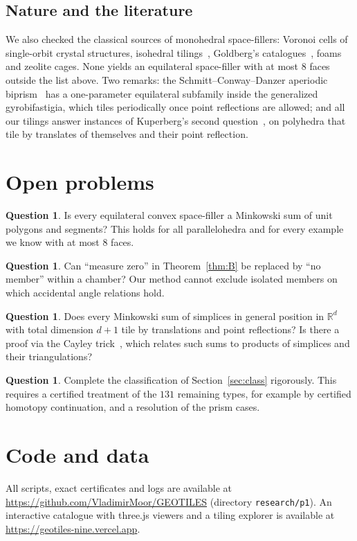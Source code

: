 \documentclass[11pt]{amsart}
\theoremstyle{definition}
\newtheorem{question}[thm]{Question}
\newcommand{\R}{\mathbb{R}}
\begin{document}
\subsection{Nature and the literature}
We also checked the classical sources of monohedral space-fillers: Voronoi cells of single-orbit crystal
structures, isohedral tilings~\cite{DFO05}, Goldberg's catalogues~\cite{Gol79}, foams and zeolite cages. None
yields an equilateral space-filler with at most $8$ faces outside the list above. Two remarks: the
Schmitt--Conway--Danzer aperiodic biprism~\cite{Sen95} has a one-parameter equilateral subfamily inside the
generalized gyrobifastigia, which tiles periodically once point reflections are allowed; and all our tilings answer
instances of Kuperberg's second question~\cite{Epp}, on polyhedra that tile by translates of themselves and their point
reflection.

\section{Open problems}\label{sec:open}

\begin{question}
Is every equilateral convex space-filler a Minkowski sum of unit polygons and segments? This holds for
all parallelohedra and for every example we know with at most $8$ faces.
\end{question}

\begin{question}
Can ``measure zero'' in Theorem~\ref{thm:B} be replaced by ``no member'' within a chamber? Our method cannot exclude
isolated members on which accidental angle relations hold.
\end{question}

\begin{question}
Does every Minkowski sum of simplices in general position in $\R^d$ with total dimension $d+1$ tile by
translations and point reflections? Is there a proof via the Cayley trick~\cite{HRS00}, which relates such sums to
products of simplices and their triangulations?
\end{question}

\begin{question}
Complete the classification of Section~\ref{sec:class} rigorously. This requires a certified treatment of the
$131$ remaining types, for example by certified homotopy continuation, and a resolution of the prism cases.
\end{question}

\section*{Code and data}
All scripts, exact certificates and logs are available at \url{https://github.com/VladimirMoor/GEOTILES}
(directory \texttt{research/p1}). An interactive catalogue with three.js viewers and a tiling explorer is available at
\url{https://geotiles-nine.vercel.app}.
\end{document}
